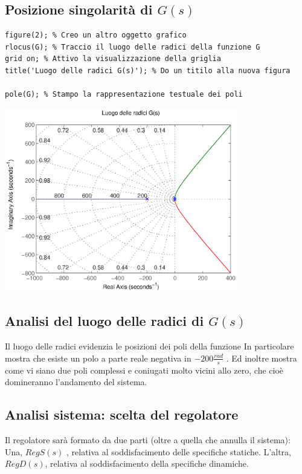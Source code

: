 \documentclass{article}
\begin{document}
\subsection*{Posizione singolarità di $ G(s) $ }

\begin{verbatim}
figure(2); % Creo un altro oggetto grafico
rlocus(G); % Traccio il luogo delle radici della funzione G
grid on; % Attivo la visualizzazione della griglia
title('Luogo delle radici G(s)'); % Do un titilo alla nuova figura

pole(G); % Stampo la rappresentazione testuale dei poli
\end{verbatim}

\includegraphics [width=4in]{prog6RADICI_02.eps}


\subsection*{Analisi del luogo delle radici di $ G(s) $ }

\begin{par}
Il luogo delle radici evidenzia le posizioni dei poli della funzione In particolare mostra che esiste un polo a parte reale negativa in $ -200 \frac{rad}{s} $ .
Ed inoltre mostra come vi siano due poli complessi e coniugati molto vicini allo zero, che cioè domineranno l'andamento del sistema.
\end{par} \vspace{1em}


\subsection*{Analisi sistema: scelta del regolatore}

\begin{par}
Il regolatore sarà formato da due parti (oltre a quella che annulla il sistema):
Una, $ RegS(s) $ , relativa al soddisfacimento delle specifiche statiche.
L'altra,  $ RegD(s) $, relativa al soddisfacimento della specifiche dinamiche.
\end{par}
\end{document}
